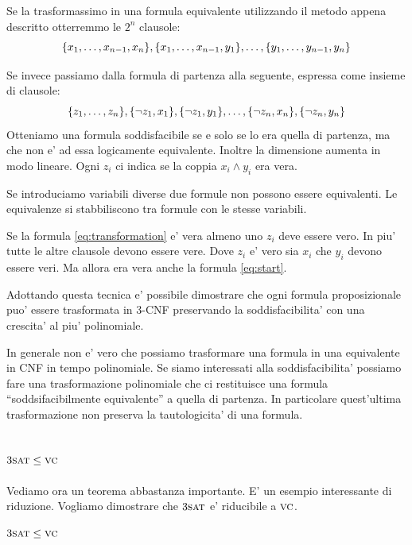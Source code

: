 Se la trasformassimo in una formula equivalente utilizzando il metodo appena descritto otterremmo le
$2^{n}$ clausole:
\begin{equation*}
    \{x_{1},\dotsc,x_{n-1},x_{n}\},\{x_{1},\dotsc,x_{n-1},y_{1}\},\dotsc,\{y_{1},\dotsc,y_{n-1},y_{n}\}
\end{equation*}

Se invece passiamo dalla formula di partenza alla seguente, espressa come insieme di clausole:
\begin{equation}\label{eq:transformation}
    \{z_{1},\dotsc,z_{n}\},\{\lnot z_{1},x_{1}\},\{\lnot z_{1},y_{1}\},\dotsc,\{\lnot
    z_{n},x_{n}\},\{\lnot z_{n},y_{n}\}
\end{equation}
Otteniamo una formula soddisfacibile se e solo se lo era quella di partenza, ma che non e' ad essa
logicamente equivalente.  Inoltre la dimensione aumenta in modo lineare.  Ogni $z_{i}$ ci indica se
la coppia $x_{i} \land y_{i}$ era vera.

Se introduciamo variabili diverse due formule non possono essere equivalenti. Le equivalenze si
stabbiliscono tra formule con le stesse variabili.

Se la formula \ref{eq:transformation} e' vera almeno uno $z_{i}$ deve essere vero. In piu' tutte le
altre clausole devono essere vere. Dove $z_{i}$ e' vero sia $x_{i}$ che $y_{i}$ devono essere veri.
Ma allora era vera anche la formula \ref{eq:start}.

Adottando questa tecnica e' possibile dimostrare che ogni formula proposizionale puo' essere
trasformata in 3-CNF preservando la soddisfacibilita' con una crescita' al piu' polinomiale.

In generale non e' vero che possiamo trasformare una formula in una equivalente in CNF in tempo
polinomiale. Se siamo interessati alla soddisfacibilita' possiamo fare una trasformazione
polinomiale che ci restituisce una formula ``soddsifacibilmente equivalente'' a quella di partenza.
In particolare quest'ultima trasformazione non preserva la tautologicita' di una formula.

\subsection{$3\textsc{sat} \leq \textsc{vc}$}

Vediamo ora un teorema abbastanza importante. E' un esempio interessante di riduzione. Vogliamo
dimostrare che $3\textsc{sat}$ e' riducibile a $\textsc{vc}$.

\begin{thm}
        $3\textsc{sat} \leq \textsc{vc}$
\end{thm}

